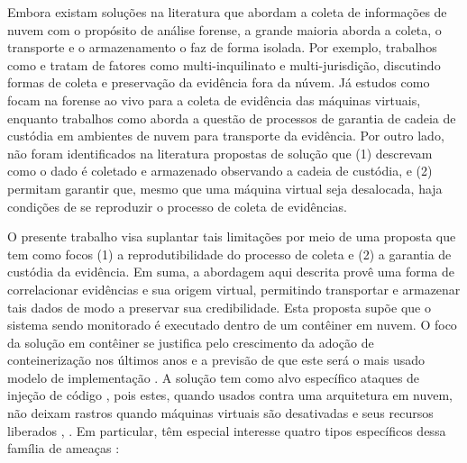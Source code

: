 \documentclass[conference]{IEEEtran}
\newcommand{\marcos}[1]{{\color{blue}{MARCOS: #1}}}
\begin{document}
%
Embora existam soluções na literatura que abordam a coleta de informações de nuvem com o propósito de análise forense, a grande maioria aborda a coleta, o transporte e o armazenamento o faz de forma isolada.
%
Por exemplo, trabalhos como \cite{Dykstra2013} e \cite{Reichert2015} tratam de fatores como multi-inquilinato e multi-jurisdição, discutindo formas de coleta e preservação da evidência fora da núvem.
%
Já estudos como \cite{George2012} focam na forense ao vivo para a coleta de evidência das máquinas virtuais, enquanto trabalhos como \cite{Sang2013} aborda a questão de processos de garantia de cadeia de custódia em ambientes de nuvem para transporte da evidência.
%
%
%
Por outro lado, não foram identificados na literatura propostas de solução que (1) descrevam como o dado é coletado e armazenado observando a cadeia de custódia, e (2) permitam garantir que, mesmo que uma máquina virtual seja desalocada, haja condições de se reproduzir o processo de coleta de evidências.



%
O presente trabalho visa suplantar tais limitações por meio de uma proposta que tem como focos (1) a reprodutibilidade do processo de coleta e (2) a garantia de custódia da evidência.
%
Em suma, a abordagem aqui descrita provê uma forma de correlacionar evidências e sua origem virtual, permitindo transportar e armazenar tais dados de modo a preservar sua credibilidade.
%
Esta proposta supõe que o sistema sendo monitorado é executado dentro de um contêiner em nuvem. O foco da solução em contêiner se justifica pelo crescimento da adoção de conteinerização nos últimos anos e a previsão de que este será o mais usado modelo de implementação \cite{Piraghaj2016}.
A solução tem como alvo específico ataques de injeção de código \cite{Case2014}, pois estes, quando usados contra uma arquitetura em nuvem, não deixam rastros quando máquinas virtuais são desativadas e seus recursos liberados \cite{Vomel2013}, \cite{Case2014}.
%
Em particular, têm especial interesse quatro tipos específicos dessa família de ameaças \cite{Case2014}:
\marcos{TODO: talvez seja prematuro listar aqui os tipos de ataques (pode valer a pena mover para seção posterior). Por enquanto, vamos deixar aqui mesmo.- HAMILTON: OK}
\end{document}

